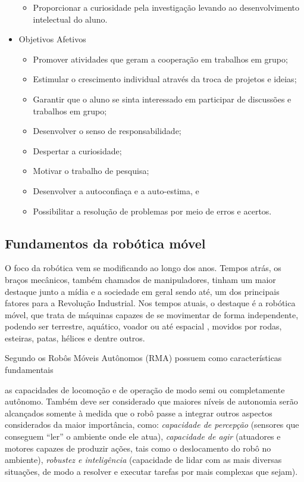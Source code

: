 \begin{itemize}
\begin{itemize}
\item Proporcionar a curiosidade pela investigação levando ao desenvolvimento intelectual do aluno.
\end{itemize}
\item Objetivos Afetivos
\begin{itemize}
\item Promover atividades que geram a cooperação em trabalhos em grupo;
\item Estimular o crescimento individual através da troca de projetos e ideias;
\item Garantir que o aluno se sinta interessado em participar de discussões e trabalhos em grupo;
\item Desenvolver o senso de responsabilidade;
\item Despertar a curiosidade;
\item Motivar o trabalho de pesquisa;
\item Desenvolver a autoconfiaça e a auto-estima, e
\item Possibilitar a resolução de problemas por meio de erros e acertos.
\end{itemize}
\end{itemize}

\subsection{Fundamentos da robótica móvel}
O foco da robótica vem se modificando ao longo dos anos. Tempos atrás, os braços mecânicos, também chamados de manipuladores, tinham um maior destaque junto a mídia e a sociedade em geral \cite{wolf2009robotica} sendo até, um dos principais fatores para a Revolução Industrial. Nos tempos atuais, o destaque é a robótica móvel, que trata de máquinas capazes de se movimentar de forma independente, podendo ser terrestre, aquático, voador ou até espacial , movidos por rodas, esteiras, patas, hélices e dentre outros. 

Segundo \cite{wolf2009robotica} os Robôs Móveis Autônomos (RMA) possuem como características fundamentais

\begin{citacao}
as capacidades de locomoção e de operação de modo semi ou 
completamente autônomo. Também deve ser considerado que maiores níveis de 
autonomia serão alcançados somente à medida que o robô passe a integrar outros 
aspectos considerados da maior importância, como: \textit{capacidade de percepção} (sensores que conseguem “ler” o ambiente onde ele atua), \textit{capacidade de agir} (atuadores e motores capazes de produzir ações, tais como o deslocamento do robô no ambiente), \textit{robustez e inteligência} (capacidade de lidar com as mais diversas situações, de modo a resolver e executar tarefas por mais complexas que sejam). 
\end{citacao}

